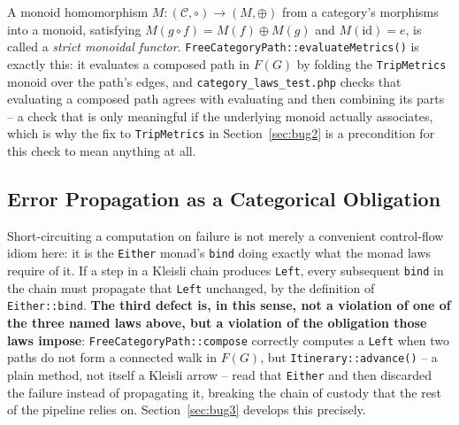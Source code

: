 A monoid homomorphism $M : (\mathcal{C}, \circ) \to (M,\oplus)$ from a category's morphisms into a monoid, satisfying $M(g \circ f) = M(f) \oplus M(g)$ and $M(\mathrm{id}) = e$, is called a \emph{strict monoidal functor}. \texttt{FreeCategoryPath::evaluateMetrics()} is exactly this: it evaluates a composed path in $F(G)$ by folding the \texttt{TripMetrics} monoid over the path's edges, and \texttt{category\_laws\_test.php} checks that evaluating a composed path agrees with evaluating and then combining its parts -- a check that is only meaningful if the underlying monoid actually associates, which is why the fix to \texttt{TripMetrics} in Section~\ref{sec:bug2} is a precondition for this check to mean anything at all.

\subsection{Error Propagation as a Categorical Obligation}

Short-circuiting a computation on failure is not merely a convenient control-flow idiom here: it is the \texttt{Either} monad's \texttt{bind} doing exactly what the monad laws require of it. If a step in a Kleisli chain produces \texttt{Left}, every subsequent \texttt{bind} in the chain must propagate that \texttt{Left} unchanged, by the definition of \texttt{Either::bind}. \textbf{The third defect is, in this sense, not a violation of one of the three named laws above, but a violation of the obligation those laws impose}: \texttt{FreeCategoryPath::compose} correctly computes a \texttt{Left} when two paths do not form a connected walk in $F(G)$, but \texttt{Itinerary::advance()} -- a plain method, not itself a Kleisli arrow -- read that \texttt{Either} and then discarded the failure instead of propagating it, breaking the chain of custody that the rest of the pipeline relies on. Section~\ref{sec:bug3} develops this precisely.
